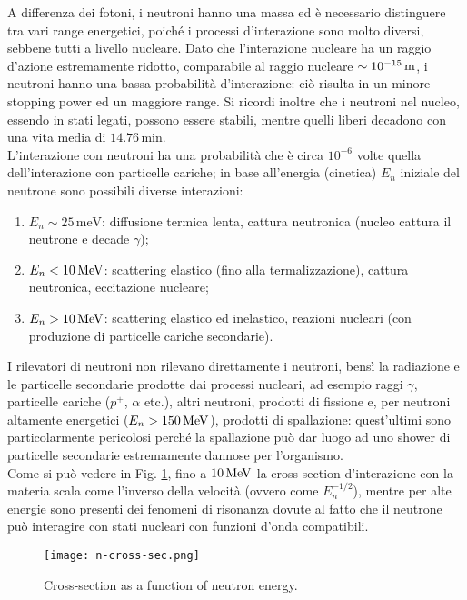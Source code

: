 A differenza dei fotoni, i neutroni hanno una massa ed è necessario distinguere tra vari range energetici, poiché i processi d'interazione sono molto diversi, sebbene tutti a livello nucleare. Dato che l'interazione nucleare ha un raggio d'azione estremamente ridotto, comparabile al raggio nucleare $ \sim 10^{-15} \,\mathrm{m} $, i neutroni hanno una bassa probabilità d'interazione: ciò risulta in un minore stopping power ed un maggiore range. Si ricordi inoltre che i neutroni nel nucleo, essendo in stati legati, possono essere stabili, mentre quelli liberi decadono con una vita media di $ 14.76\,\text{min} $.\\
L'interazione con neutroni ha una probabilità che è circa $ 10^{-6} $ volte quella dell'interazione con particelle cariche; in base all'energia (cinetica) $ E_n $ iniziale del neutrone sono possibili diverse interazioni:
\begin{enumerate}
	\item $ E_n \sim 25 \,\text{meV} $: diffusione termica lenta, cattura neutronica (nucleo cattura il neutrone e decade $ \gamma $);
	\item $ E_n < 10 \,\mathrm{MeV} $: scattering elastico (fino alla termalizzazione), cattura neutronica, eccitazione nucleare;
	\item $ E_n > 10 \,\mathrm{MeV} $: scattering elastico ed inelastico, reazioni nucleari (con produzione di particelle cariche secondarie).
\end{enumerate}
I rilevatori di neutroni non rilevano direttamente i neutroni, bensì la radiazione e le particelle secondarie prodotte dai processi nucleari, ad esempio raggi $ \gamma $, particelle cariche ($ p^+ $, $ \alpha $ etc.), altri neutroni, prodotti di fissione e, per neutroni altamente energetici ($ E_n > 150\,\mathrm{MeV} $), prodotti di spallazione: quest'ultimi sono particolarmente pericolosi perché la spallazione può dar luogo ad uno shower di particelle secondarie estremamente dannose per l'organismo.\\
Come si può vedere in Fig. \ref{n-cross-sec}, fino a $ 10\,\mathrm{MeV} $ la cross-section d'interazione con la materia scala come l'inverso della velocità (ovvero come $ E_n^{-1/2} $), mentre per alte energie sono presenti dei fenomeni di risonanza dovute al fatto che il neutrone può interagire con stati nucleari con funzioni d'onda compatibili.

\begin{figure}[!t]
	\centering
	\texttt{[image: n-cross-sec.png]}
	\caption{Cross-section as a function of neutron energy.}
	\label{n-cross-sec}
\end{figure}


